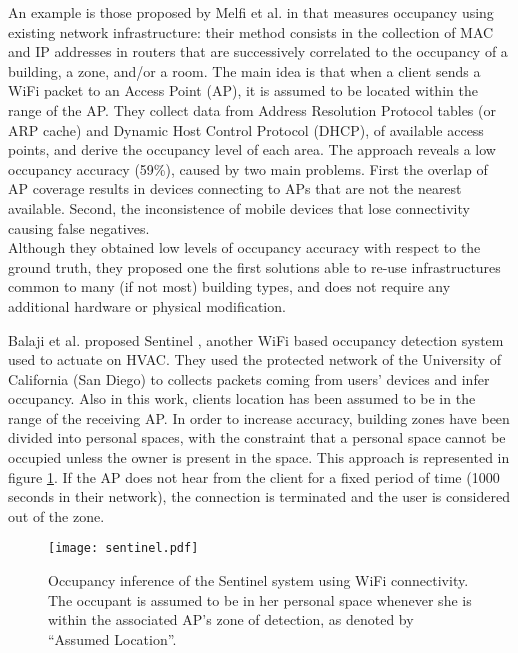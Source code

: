 \smallskip
An example is those proposed by Melfi et al. in \cite{Melfi2011} that measures occupancy using existing network infrastructure: their method consists in the collection of MAC and IP addresses in routers that are successively correlated to the occupancy of a building, a zone, and/or a room. The main idea is that when a client sends a WiFi packet to an Access Point (AP), it is assumed to be located within the range of the AP.
They collect data from Address Resolution Protocol tables (or ARP cache) and Dynamic Host Control Protocol (DHCP), of available access points, and derive the occupancy level of each area.
The approach reveals a low occupancy accuracy (59\%), caused by two main problems. First the overlap of AP coverage results in devices connecting to APs that are not the nearest available. Second, the inconsistence of mobile devices that lose connectivity causing false negatives.\\
Although they obtained low levels of occupancy accuracy with respect to the ground truth, they proposed one the first solutions able to re-use infrastructures common to many (if not most) building types, and does not require any additional hardware or physical modification.

\smallskip
Balaji et al. proposed Sentinel \cite{Balaji2013}, another WiFi based occupancy detection system used to actuate on HVAC. They used the protected network of the University of California (San Diego) to collects packets coming from users' devices and infer occupancy. Also in this work, clients location has been assumed to be in the range of the receiving AP. In order to increase accuracy, building zones have been divided into personal spaces, with the constraint that a personal space cannot be occupied unless the owner is present in the space. This approach is represented in figure \ref{fig:sentinel}. If the AP does not hear from the client for a fixed period of time (1000 seconds in their network), the connection is terminated and the user is considered out of the zone.

\begin{figure}[h!tb]
\centering
\texttt{[image: sentinel.pdf]}
\caption[Occupancy inference of the Sentinel system using WiFi connectivity]{Occupancy inference of the Sentinel system using WiFi connectivity. The occupant is assumed to be in her personal space whenever she is within the associated AP’s zone of detection, as denoted by “Assumed Location”.}
\label{fig:sentinel}
\end{figure}

